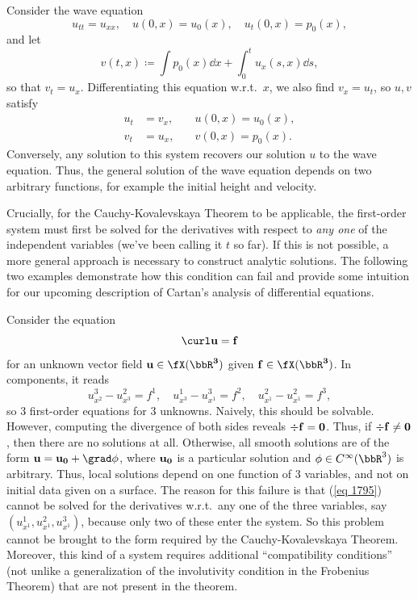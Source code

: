 \begin{example}\label{ex wave eq kovalevskaya}
    Consider the wave equation 
    \[u_{tt}=u_{xx},\quad u(0,x)=u_0(x),\quad u_t(0,x)=p_0(x),\]
    and let 
    \[v(t,x)\coloneqq \int p_0(x)\dd x+\int_0^t u_x(s,x)\dd s,\]
    so that $v_t=u_x$. Differentiating this equation w.r.t.\ $x$, we also find $v_x=u_t$, so $u,v$ satisfy 
    \begin{align}
        u_t&=v_x,\quad & u(0,x)=u_0(x),\\
        v_t&=u_x,\quad & v(0,x)=p_0(x).
    \end{align}
    Conversely, any solution to this system recovers our solution $u$ to the wave equation. Thus, the general solution of the wave equation depends on two arbitrary functions, for example the initial height and velocity.
\end{example}

Crucially, for the Cauchy-Kovalevskaya Theorem to be applicable, the first-order system must first be solved for the derivatives with respect to \emph{any one} of the independent variables (we've been calling it $t$ so far). If this is not possible, a more general approach is necessary to construct analytic solutions. The following two examples demonstrate how this condition can fail and provide some intuition for our upcoming description of Cartan's analysis of differential equations.

\begin{example}
    Consider the equation 
    \[\curl \bf{u}=\bf{f}\]
    for an unknown vector field $\bf{u}\in\fX(\bbR^3)$ given $\bf{f}\in\fX(\bbR^3)$. In components, it reads 
    \[u^3_{x^2}-u^2_{x^3}=f^1,\quad u^1_{x^3}-u^3_{x^1}=f^2,\quad u^2_{x^1}-u^2_{x^1}=f^3,\label{eq 1795}\]
    so $3$ first-order equations for $3$ unknowns. Naively, this should be solvable. However, computing the divergence of both sides reveals $\div \bf{f}=0$. Thus, if $\div\bf{f}\neq 0$, then there are no solutions at all. Otherwise, all smooth solutions are of the form $\bf{u}=\bf{u}_0+\grad \phi$, where $\bf{u}_0$ is a particular solution and $\phi\in C^\infty(\bbR^3)$ is arbitrary. Thus, local solutions depend on one function of $3$ variables, and not on initial data given on a surface. The reason for this failure is that (\ref{eq 1795}) cannot be solved for the derivatives w.r.t.\ any one of the three variables, say $(u^1_{x^1},u^2_{x^1},u^3_{x^1})$, because only two of these enter the system. So this problem cannot be brought to the form required by the Cauchy-Kovalevskaya Theorem. Moreover, this kind of a system requires additional ``compatibility conditions'' (not unlike a generalization of the involutivity condition in the Frobenius Theorem) that are not present in the theorem.
\end{example}

